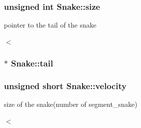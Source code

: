 \subsubsection[{\texorpdfstring{size}{size}}]{\setlength{\rightskip}{0pt plus 5cm}unsigned int Snake\+::size}\hypertarget{group__snake_ga29ba822024f7651a9fa0c80df840252b}{}\label{group__snake_ga29ba822024f7651a9fa0c80df840252b}


pointer to the tail of the snake 

$<$ 
\subsubsection[{\texorpdfstring{tail}{tail}}]{$\ast$ Snake\+::tail}\hypertarget{group__snake_gada92e10f60af5b1afdb7318df07a1a33}{}\label{group__snake_gada92e10f60af5b1afdb7318df07a1a33}
\subsubsection[{\texorpdfstring{velocity}{velocity}}]{\setlength{\rightskip}{0pt plus 5cm}unsigned short Snake\+::velocity}\hypertarget{group__snake_gac444a5a9306233f5be0b603335785b3d}{}\label{group__snake_gac444a5a9306233f5be0b603335785b3d}


size of the snake(number of segment\+\_\+snake) 

$<$ 